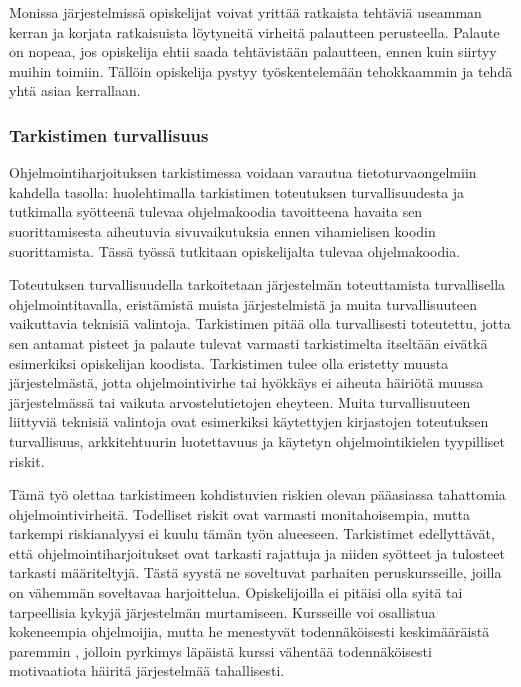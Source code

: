 Monissa järjestelmissä opiskelijat voivat yrittää ratkaista tehtäviä useamman
kerran ja korjata ratkaisuista löytyneitä virheitä palautteen perusteella.
Palaute on nopeaa, jos opiskelija ehtii saada tehtävistään palautteen, ennen
kuin siirtyy muihin toimiin. Tällöin opiskelija pystyy työskentelemään
tehokkaammin ja tehdä yhtä asiaa kerrallaan.

\subsubsection{Tarkistimen turvallisuus}

Ohjelmointiharjoituksen tarkistimessa voidaan varautua tietoturvaongelmiin
kahdella tasolla: huolehtimalla tarkistimen toteutuksen turvallisuudesta ja
tutkimalla syötteenä tulevaa ohjelmakoodia tavoitteena havaita sen
suorittamisesta aiheutuvia sivuvaikutuksia ennen vihamielisen koodin
suorittamista. Tässä työssä tutkitaan opiskelijalta tulevaa ohjelmakoodia.

Toteutuksen turvallisuudella tarkoitetaan järjestelmän toteuttamista
turvallisella ohjelmointitavalla, eristämistä muista järjestelmistä ja
muita turvallisuuteen vaikuttavia teknisiä valintoja.
Tarkistimen pitää olla turvallisesti toteutettu, jotta sen antamat pisteet ja
palaute tulevat varmasti tarkistimelta itseltään eivätkä esimerkiksi opiskelijan
koodista. Tarkistimen tulee olla eristetty muusta järjestelmästä, jotta
ohjelmointivirhe tai hyökkäys ei aiheuta häiriötä muussa järjestelmässä tai
vaikuta arvostelutietojen eheyteen. Muita turvallisuuteen liittyviä teknisiä
valintoja ovat esimerkiksi käytettyjen kirjastojen toteutuksen turvallisuus,
arkkitehtuurin luotettavuus ja käytetyn ohjelmointikielen tyypilliset riskit.

Tämä työ olettaa tarkistimeen kohdistuvien riskien olevan pääasiassa
tahattomia ohjelmointivirheitä. Todelliset riskit ovat varmasti
monitahoisempia, mutta tarkempi riskianalyysi ei kuulu tämän työn alueeseen.
Tarkistimet edellyttävät, että ohjelmointiharjoitukset ovat tarkasti rajattuja
ja niiden syötteet ja tulosteet tarkasti määriteltyjä. Tästä syystä ne
soveltuvat parhaiten peruskursseille, joilla on vähemmän soveltavaa
harjoittelua. Opiskelijoilla ei pitäisi olla syitä tai tarpeellisia kykyjä
järjestelmän murtamiseen. Kursseille voi osallistua kokeneempia ohjelmoijia,
mutta he menestyvät todennäköisesti keskimääräistä paremmin
\citep{hagan2000does}, jolloin pyrkimys läpäistä kurssi vähentää
todennäköisesti motivaatiota häiritä järjestelmää tahallisesti.

